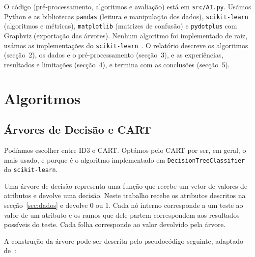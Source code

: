 \documentclass[12pt,a4paper]{article}
\newcommand{\code}[1]{\texttt{#1}}
\begin{document}
O código (pré-processamento, algoritmos e avaliação) está em \code{src/AI.py}. Usámos Python e as bibliotecas \code{pandas} (leitura e manipulação dos dados), \code{scikit-learn} (algoritmos e métricas), \code{matplotlib} (matrizes de confusão) e \code{pydotplus} com Graphviz (exportação das árvores). Nenhum algoritmo foi implementado de raiz, usámos as implementações do \code{scikit-learn}~\cite{sklearn}. O relatório descreve os algoritmos (secção~2), os dados e o pré-processamento (secção~3), e as experiências, resultados e limitações (secção~4), e termina com as conclusões (secção~5).

\clearpage
\section{Algoritmos}

\subsection{Árvores de Decisão e CART}

Podíamos escolher entre ID3 e CART. Optámos pelo CART por ser, em geral, o mais usado, e porque é o algoritmo implementado em \code{DecisionTreeClassifier} do \code{scikit-learn}.

Uma árvore de decisão representa uma função que recebe um vetor de valores de atributos e devolve uma decisão. Neste trabalho recebe os atributos descritos na secção~\ref{sec:dados} e devolve 0 ou 1. Cada nó interno corresponde a um teste ao valor de um atributo e os ramos que dele partem correspondem aos resultados possíveis do teste. Cada folha corresponde ao valor devolvido pela árvore.

A construção da árvore pode ser descrita pelo pseudocódigo seguinte, adaptado de~\cite{russell}:
\end{document}
